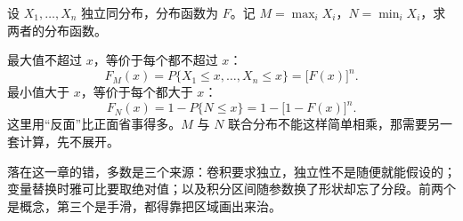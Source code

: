 \begin{example}[最大值与最小值]
设 $X_1,\dots,X_n$ 独立同分布，分布函数为 $F$。记 $M=\max_i X_i$，$N=\min_i X_i$，求两者的分布函数。
\end{example}

最大值不超过 $x$，等价于每个都不超过 $x$：
\[
F_M(x)=P\{X_1\le x,\dots,X_n\le x\}=\big[F(x)\big]^n .
\]
最小值大于 $x$，等价于每个都大于 $x$：
\[
F_N(x)=1-P\{N\le x\}=1-\big[1-F(x)\big]^n .
\]
这里用“反面”比正面省事得多。$M$ 与 $N$ 联合分布不能这样简单相乘，那需要另一套计算，先不展开。

落在这一章的错，多数是三个来源：卷积要求独立，独立性不是随便就能假设的；变量替换时雅可比要取绝对值；以及积分区间随参数换了形状却忘了分段。前两个是概念，第三个是手滑，都得靠把区域画出来治。
